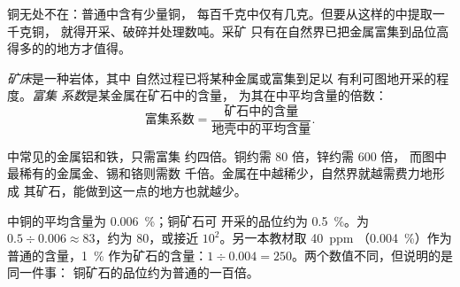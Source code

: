 铜无处不在：普通中含有少量铜，
每百千克中仅有几克。但要从这样的中提取一千克铜，
就得开采、破碎并处理数吨。采矿
只有在自然界已把金属富集到品位高得多的的地方才值得。

\begin{definition}[矿床与富集系数]\label{def:g9:earth-resources:ore-deposit}
\emph{矿床}是一种岩体，其中
自然过程已将某种金属或富集到足以
有利可图地开采的程度。\emph{富集
系数}是某金属在矿石中的含量，
为其在中平均含量的倍数：
\[
\text{富集系数} = \frac{\text{矿石中的含量}}{\text{地壳中的平均含量}} .
\]
\end{definition}

中常见的金属铝和铁，只需富集
约四倍。铜约需 80 倍，锌约需 600 倍，
而图中最稀有的金属金、锡和铬则需数
千倍。金属在中越稀少，自然界就越需费力地形成
其矿石，能做到这一点的地方也就越少。

\begin{example}[铜]
中铜的平均含量为 \qty{0.006}{\%}；铜矿石可
开采的品位约为 \qty{0.5}{\%}。为 $0.5 \div 0.006
\approx 83$，约为 80，或接近 $10^2$。另一本教材取 \qty{40}{ppm}
（\qty{0.004}{\%}）作为普通的含量，\qty{1}{\%} 作为矿石的含量：$1 \div
0.004 = 250$。两个数值不同，但说明的是同一件事：
铜矿石的品位约为普通的一百倍。
\end{example}

